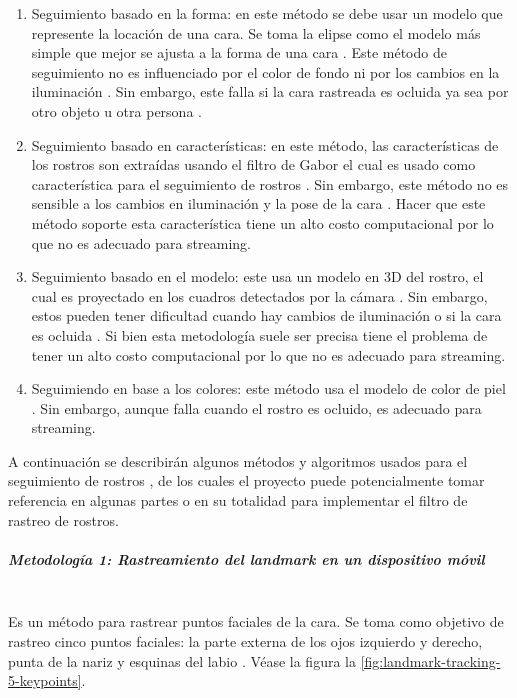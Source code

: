 \documentclass[a4paper,openright,12pt]{report}
\begin{document}
\begin{enumerate}
    \item Seguimiento basado en la forma: en este método se debe usar un modelo
    que represente la locación de una cara. Se toma la elipse como el modelo más
    simple que mejor se ajusta a la forma de una cara \cite{eleftheriadis1995automatic}. Este método de
    seguimiento no es influenciado por el color de fondo ni por los cambios en
    la iluminación \cite{shaik2007robust}. Sin embargo, este falla si la cara rastreada es ocluida ya
    sea por otro objeto u otra persona \cite{shaik2007robust}.
    \item Seguimiento basado en características:  en este método, las
    características de los rostros son extraídas usando el filtro de Gabor el
    cual es usado como característica para el seguimiento de rostros \cite{shaik2007robust}. Sin
    embargo, este método no es sensible a los cambios en iluminación y la pose
    de la cara \cite{shaik2007robust}. Hacer que este método soporte esta característica tiene un alto
    costo computacional por lo que no es adecuado para streaming.
    \item Seguimiento basado en el modelo: este usa un modelo en 3D del rostro,
    el cual es proyectado en los cuadros detectados por la cámara \cite{shaik2007robust}. Sin embargo,
    estos pueden tener dificultad cuando hay cambios de iluminación o si la cara
    es ocluida \cite{smolyanskiy2014real}. Si bien esta metodología suele ser precisa tiene el problema de
    tener un alto costo computacional por lo que no es adecuado para streaming.
    \item Seguimiendo en base a los colores: este método usa el modelo de color
    de piel \cite{shaik2007robust}. Sin embargo, aunque falla cuando el rostro es ocluido, es adecuado
    para streaming.
\end{enumerate}

A continuación se describirán algunos métodos y algoritmos usados para el
seguimiento de rostros , de los cuales el proyecto puede potencialmente tomar
referencia en algunas partes o en su totalidad para implementar el filtro de
rastreo de rostros.

\subparagraph{Metodología 1: Rastreamiento del landmark en un dispositivo móvil}
\mbox{} \\
Es un método para rastrear puntos faciales de la cara. Se toma como
objetivo de rastreo cinco puntos faciales: la parte externa de los ojos
izquierdo y derecho, punta de la nariz y esquinas del labio
\cite{wettum2017facial}. Véase la figura
la \ref{fig:landmark-tracking-5-keypoints}.\\
\end{document}
